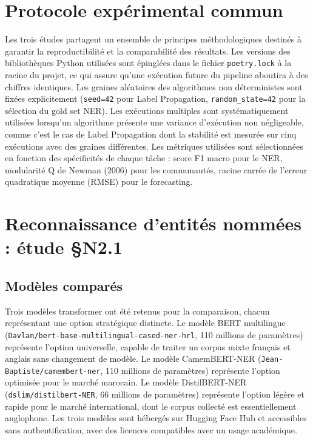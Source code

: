 \documentclass[11pt,a4paper,openany]{report}
\begin{document}
\section{Protocole exp\'erimental commun}

Les trois \'etudes partagent un ensemble de principes m\'ethodologiques destin\'es \`a garantir la reproductibilit\'e et la comparabilit\'e des r\'esultats. Les versions des biblioth\`eques Python utilis\'ees sont \'epingl\'ees dans le fichier \texttt{poetry.lock} \`a la racine du projet, ce qui assure qu'une ex\'ecution future du pipeline aboutira \`a des chiffres identiques. Les graines al\'eatoires des algorithmes non d\'eterministes sont fix\'ees explicitement (\texttt{seed=42} pour Label Propagation, \texttt{random\_state=42} pour la s\'election du gold set NER). Les ex\'ecutions multiples sont syst\'ematiquement utilis\'ees lorsqu'un algorithme pr\'esente une variance d'ex\'ecution non n\'egligeable, comme c'est le cas de Label Propagation dont la stabilit\'e est mesur\'ee sur cinq ex\'ecutions avec des graines diff\'erentes. Les m\'etriques utilis\'ees sont s\'electionn\'ees en fonction des sp\'ecificit\'es de chaque t\^ache : score F1 macro pour le NER, modularit\'e Q de Newman (2006) pour les communaut\'es, racine carr\'ee de l'erreur quadratique moyenne (RMSE) pour le forecasting.

\section{Reconnaissance d'entit\'es nomm\'ees : \'etude \S N2.1}

\subsection{Mod\`eles compar\'es}

Trois mod\`eles transformer ont \'et\'e retenus pour la comparaison, chacun repr\'esentant une option strat\'egique distincte. Le mod\`ele BERT multilingue (\texttt{Davlan/bert-base-multilingual-cased-ner-hrl}, 110 millions de param\`etres) repr\'esente l'option universelle, capable de traiter un corpus mixte fran\c{c}ais et anglais sans changement de mod\`ele. Le mod\`ele CamemBERT-NER (\texttt{Jean-Baptiste/camembert-ner}, 110 millions de param\`etres) repr\'esente l'option optimis\'ee pour le march\'e marocain. Le mod\`ele DistilBERT-NER (\texttt{dslim/distilbert-NER}, 66 millions de param\`etres) repr\'esente l'option l\'eg\`ere et rapide pour le march\'e international, dont le corpus collect\'e est essentiellement anglophone. Les trois mod\`eles sont h\'eberg\'es sur Hugging Face Hub et accessibles sans authentification, avec des licences compatibles avec un usage acad\'emique.
\end{document}
